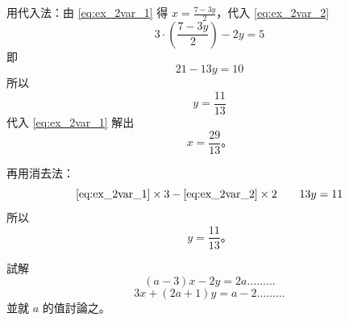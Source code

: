 \begin{solution*}
用代入法：由 \eqref{eq:ex_2var_1} 得 $x = \frac{7-3y}{2}$，代入 \eqref{eq:ex_2var_2}
\begin{equation*}
  3 \cdot \left( \frac{7-3y}{2} \right) - 2y = 5
\end{equation*}
即
\begin{equation*}
  21 - 13y = 10
\end{equation*}
所以
\begin{equation*}
  y = \frac{11}{13}
\end{equation*}
代入 \eqref{eq:ex_2var_1} 解出
\begin{equation*}
  x = \frac{29}{13} \text{。}
\end{equation*}

再用消去法：
\begin{equation*}
  \eqref{eq:ex_2var_1} \times 3 - \eqref{eq:ex_2var_2} \times 2 \qquad 13y = 11
\end{equation*}
所以
\begin{equation*}
  y = \frac{11}{13} \text{。}
\end{equation*}
\end{solution*}

\begin{example}\label{ex:4-3-5}
試解
\begin{equation}\label{eq:ex_param_1}
  (a-3)x - 2y = 2a \dots\dots\dots
\end{equation}
\begin{equation}\label{eq:ex_param_2}
  3x + (2a+1)y = a-2 \dots\dots\dots
\end{equation}
並就 $a$ 的值討論之。
\end{example}

